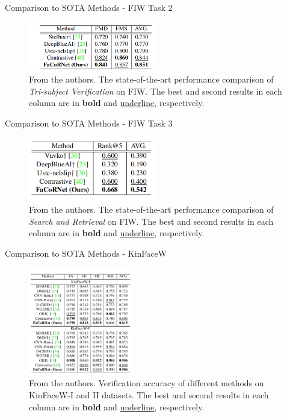 \documentclass[aspectratio=169,xcolor=dvipsnames]{beamer}
\begin{document}

\begin{frame}{Comparison to SOTA Methods - FIW Task 2}
    \begin{figure}
        \centering
        \includegraphics[width=0.5\textwidth]{imgs/T2.png}
        \caption{From the authors. The state-of-the-art performance comparison of \textit{Tri-subject Verification} on FIW. The best and second results in each column are in \textbf{bold} and \underline{underline}, respectively.}
        \label{fig:results-t2}
    \end{figure}
\end{frame}


\begin{frame}{Comparison to SOTA Methods - FIW Task 3}
    \begin{figure}
        \centering
        \includegraphics[width=0.5\textwidth]{imgs/T3.png}
        \caption{From the authors. The state-of-the-art performance comparison of \textit{Search and Retrieval} on FIW. The best and second results in each column are in \textbf{bold} and \underline{underline}, respectively.}
        \label{fig:results-t3}
    \end{figure}
\end{frame}


\begin{frame}{Comparison to SOTA Methods - KinFaceW}
    \begin{figure}
        \centering
        \includegraphics[width=0.4\textwidth]{imgs/T4.png}
        \caption{From the authors. Verification accuracy of different methods on KinFaceW-I and II datasets. The best and second results in each column are in \textbf{bold} and \underline{underline}, respectively.}
        \label{fig:results-t4}
    \end{figure}
\end{frame}
\end{document}
